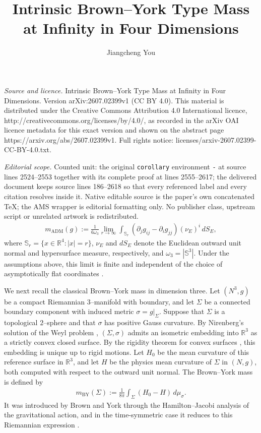 \documentclass[10pt,a4paper]{amsart}
\newcommand{\R}{\mathbb{R}}
\newcommand{\Sph}{\mathbb{S}}
\newcommand{\ADM}{\mathrm{ADM}}
\begin{document}
\title[Intrinsic Brown--York Type Mass at Infinity in Four Dimensio]{Intrinsic Brown--York Type Mass at Infinity in Four Dimensions}
\author{Jiangcheng You}
\date{}
\maketitle
\noindent\emph{Source and licence.} Intrinsic Brown--York Type Mass at Infinity in Four Dimensions. Version arXiv:2607.02399v1 (CC BY 4.0). This material is distributed under the Creative Commons Attribution 4.0 International licence, http://creativecommons.org/licenses/by/4.0/, as recorded in the arXiv OAI licence metadata for this exact version and shown on the abstract page https://arxiv.org/abs/2607.02399v1. Full rights notice: licenses/arxiv-2607.02399-CC-BY-4.0.txt.\par\smallskip
\noindent\textit{Editorial scope.} Counted unit: the original \texttt{corollary} environment \texttt{-} at source lines 2524--2553 together with its complete proof at lines 2555--2617; the delivered document keeps source lines 186--2618 so that every referenced label and every citation resolves inside it. Native editable source is the paper's own concatenated TeX; the AMS wrapper is editorial formatting only. No publisher class, upstream script or unrelated artwork is redistributed.
	\begin{align}\label{eq:four-dimensional-ADM-mass}
		m_{\ADM}(g)
		:=
		\frac{1}{6\omega_3}
		\lim_{r\to\infty}
		\int_{\Sph_r}
		\left(
		\partial_jg_{ij}
		-
		\partial_ig_{jj}
		\right)
		(\nu_E)^i\,dS_E,
	\end{align}
	where $\Sph_r=\{x\in\R^4:|x|=r\}$, $\nu_E$ and $dS_E$ denote the
	Euclidean outward unit normal and hypersurface measure, respectively, and
	$\omega_3=|\Sph^3|$. Under the assumptions above, this limit is finite and
	independent of the choice of asymptotically flat coordinates
	\cite{Bartnik86,McCormick24}.
	
	We next recall the classical Brown--York mass in dimension three. Let $(N^3,g)$ be a compact Riemannian
	$3$--manifold with boundary, and let $\Sigma$ be a connected boundary
	component with induced metric $\sigma=g|_\Sigma$. Suppose that $\Sigma$ is
	a topological $2$--sphere and that $\sigma$ has positive Gauss curvature.
	By Nirenberg's solution of the Weyl problem \cite{Nirenberg},
	$(\Sigma,\sigma)$ admits an isometric embedding into $\mathbb R^3$
	as a strictly convex closed surface. By the rigidity theorem for
	convex surfaces \cite{CohnVossen}, this embedding is unique up to
	rigid motions. Let $H_0$ be
	the mean curvature of this reference surface in $\mathbb R^3$, and let
	$H$ be the physics mean curvature of $\Sigma$ in $(N,g)$, both computed with
	respect to the outward unit normal. The Brown--York mass is defined by
	\begin{align}\label{eq:classical-BY}
		m_{\mathrm{BY}}(\Sigma)
		:=
		\frac{1}{8\pi}
		\int_{\Sigma}(H_0-H)\,d\mu_\sigma .
	\end{align}
	It was introduced by Brown and York through the Hamilton--Jacobi analysis
	of the gravitational action, and in the time-symmetric case it reduces to
	this Riemannian expression \cite{BrownYork}.
	
\end{document}
